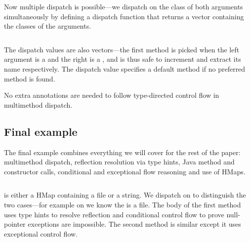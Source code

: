 Now multiple dispatch is possible---we dispatch on the class of both
arguments simultaneously by defining a dispatch function that returns
a vector containing the classes of the arguments.
\begin{Code}
\begin{exmp}
\inputminted[firstline=6,lastline=23]{clojure}{code/demo/src/demo/eg7.clj}
\end{exmp}
\end{Code}
The dispatch values are also vectors---the first method is picked
when the left argument is a  and the right is a ,
and is thus safe to increment and extract its name respectively.
The dispatch value  specifies a default
method if no preferred method is found.

No extra annotations are needed to follow type-directed control flow
in multimethod dispatch.

\subsection{Final example}

The final example combines everything we will cover for the rest of the paper:
multimethod dispatch, reflection resolution via type hints, Java method
and constructor calls, conditional and exceptional flow reasoning
and use of HMaps. 
\begin{Code}
\begin{exmp}
\inputminted[firstline=6,lastline=20]{clojure}{code/demo/src/demo/eg8.clj}
\end{exmp}
\end{Code}
 is either a HMap containing a file
or a string. We dispatch on  to distinguish the two cases---for example on 
we know the  is a file.
The body of the first method uses type hints to resolve reflection
and conditional control flow to prove null-pointer exceptions are impossible.
The second method is similar except it uses exceptional control flow.









